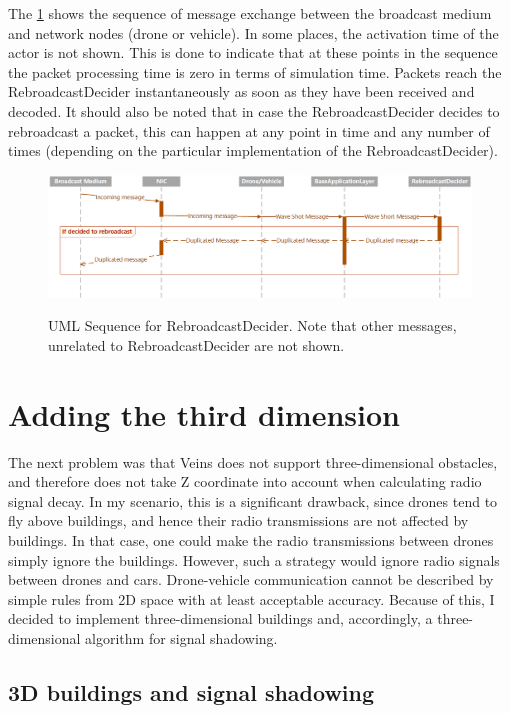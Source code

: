 \documentclass[]{nsm-thesis}
\begin{document}
The \cref{fig:rebroadcastdeciderseq} shows the sequence of message exchange between the broadcast medium and network nodes (drone or vehicle). In some places, the activation time of the actor is not shown. This is done to indicate that at these points in the sequence the packet processing time is zero in terms of simulation time. Packets reach the RebroadcastDecider instantaneously as soon as they have been received and decoded. It should also be noted that in case the RebroadcastDecider decides to rebroadcast a packet, this can happen at any point in time and any number of times (depending on the particular implementation of the RebroadcastDecider).

\begin{figure}
  	\caption{UML Sequence for RebroadcastDecider. Note that other messages, unrelated to RebroadcastDecider are not shown.}
	\centering
	\includegraphics[width=1\textwidth]{figures/RebroadcastDecider.png}
	\label{fig:rebroadcastdeciderseq}
\end{figure}

\section{Adding the third dimension}

The next problem was that Veins does not support three-dimensional obstacles, and therefore does not take Z coordinate into account when calculating radio signal decay. In my scenario, this is a significant drawback, since drones tend to fly above buildings, and hence their radio transmissions are not affected by buildings. In that case, one could make the radio transmissions between drones simply ignore the buildings. However, such a strategy would ignore radio signals between drones and cars. Drone-vehicle communication cannot be described by simple rules from 2D space with at least acceptable accuracy. Because of this, I decided to implement three-dimensional buildings and, accordingly, a three-dimensional algorithm for signal shadowing.

\subsection{3D buildings and signal shadowing}
\end{document}
